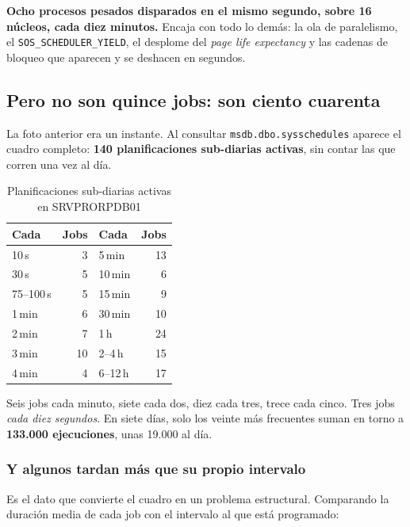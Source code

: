 \documentclass[11pt,a4paper]{article}
\newcommand{\cod}[1]{\texttt{\small #1}}
\newcommand{\critico}[1]{\textcolor{rojo}{\textbf{#1}}}
\begin{document}
\textbf{Ocho procesos pesados disparados en el mismo segundo, sobre 16
núcleos, cada diez minutos.} Encaja con todo lo demás: la ola de
paralelismo, el \cod{SOS\_SCHEDULER\_YIELD}, el desplome del \emph{page life
expectancy} y las cadenas de bloqueo que aparecen y se deshacen en segundos.

\subsection{Pero no son quince jobs: son ciento cuarenta}

La foto anterior era un instante. Al consultar \cod{msdb.dbo.sysschedules}
aparece el cuadro completo: \critico{140 planificaciones sub-diarias activas},
sin contar las que corren una vez al día.

\begin{table}[h]
\centering
\small
\begin{tabular}{lrlr}
\toprule
\textbf{Cada} & \textbf{Jobs} & \textbf{Cada} & \textbf{Jobs} \\
\midrule
10\,s  & 3  & 5\,min  & 13 \\
30\,s  & 5  & 10\,min & 6 \\
75--100\,s & 5 & 15\,min & 9 \\
1\,min & 6  & 30\,min & 10 \\
2\,min & 7  & 1\,h    & 24 \\
3\,min & 10 & 2--4\,h & 15 \\
4\,min & 4  & 6--12\,h & 17 \\
\bottomrule
\end{tabular}
\caption{Planificaciones sub-diarias activas en SRVPRORPDB01}
\end{table}

Seis jobs cada minuto, siete cada dos, diez cada tres, trece cada cinco. Tres
jobs \emph{cada diez segundos}. En siete días, solo los veinte más frecuentes
suman en torno a \textbf{133.000 ejecuciones}, unas 19.000 al día.

\subsubsection*{Y algunos tardan más que su propio intervalo}

Es el dato que convierte el cuadro en un problema estructural. Comparando la
duración media de cada job con el intervalo al que está programado:
\end{document}
